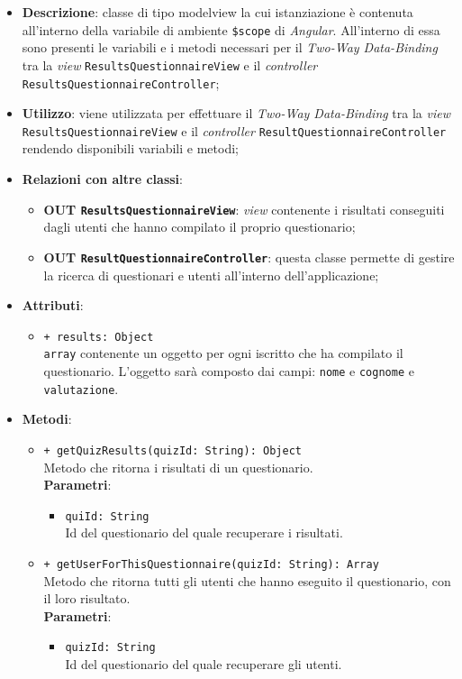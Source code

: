 	\begin{itemize}
		\item \textbf{Descrizione}: classe di tipo modelview la cui istanziazione è contenuta all'interno della variabile di ambiente \texttt{\$scope} di \textit{Angular}. All'interno di essa sono presenti le variabili e i metodi necessari per il \textit{Two-Way Data-Binding} tra la \textit{view} \texttt{ResultsQuestionnaireView} e il \textit{controller} \texttt{ResultsQuestionnaireController};
		\item \textbf{Utilizzo}: viene utilizzata per effettuare il \textit{Two-Way Data-Binding} tra la \textit{view}\\ \texttt{ResultsQuestionnaireView} e il \textit{controller} \texttt{ResultQuestionnaireController} rendendo disponibili variabili e metodi;
		\item \textbf{Relazioni con altre classi}: 
		\begin{itemize}
			\item \textbf{OUT \texttt{ResultsQuestionnaireView}}: \textit{view} contenente i risultati conseguiti dagli utenti che hanno compilato il proprio questionario; 
			\item \textbf{OUT \texttt{ResultQuestionnaireController}}: questa classe permette di gestire la ricerca di questionari e utenti all’interno dell’applicazione;
		\end{itemize}
		\item \textbf{Attributi}: 
		\begin{itemize}
				\item \texttt{+ results: Object} \\ \texttt{array} contenente un oggetto per ogni iscritto che ha compilato il questionario. L'oggetto sarà composto dai campi: \texttt{nome} e \texttt{cognome} e \texttt{valutazione}.
		\end{itemize}
		\item \textbf{Metodi}: 
		\begin{itemize}
			\item \texttt{+ getQuizResults(quizId: String): Object} \\ Metodo che ritorna i risultati di un questionario.\\
			\textbf{Parametri}:
			\begin{itemize}
				\item \texttt{quiId: String} \\ 
				Id del questionario del quale recuperare i risultati.
			\end{itemize}
			\item \texttt{+ getUserForThisQuestionnaire(quizId: String): Array} \\ Metodo che ritorna tutti gli utenti che hanno eseguito il questionario, con il loro risultato.\\
			\textbf{Parametri}:
			\begin{itemize}
				\item \texttt{quizId: String} \\ Id del questionario del quale recuperare gli utenti.
			\end{itemize}
				
		\end{itemize}
	\end{itemize}

	